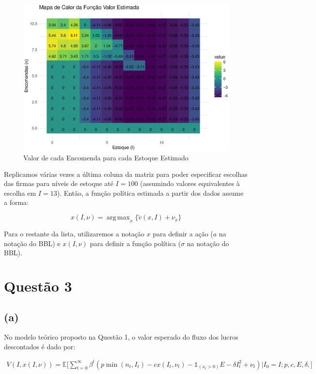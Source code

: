 \documentclass{article}
\DeclareMathOperator*{\argmax}{arg\,max}
\begin{document}
\begin{figure}[H]
    \centering
    \includegraphics{figs and tabs/value_function.eps}
    \caption{Valor de cada Encomenda para cada Estoque Estimado}
    \label{fig:valuefunction}
\end{figure}

Replicamos várias vezes a última coluna da matriz para poder especificar escolhas das firmas para níveis de estoque até $I = 100$ (assumindo valores equivalentes à escolha em $I=13$). Então, a função política estimada a partir dos dados assume a forma:

\begin{equation*}
    x(I,\nu) = \argmax_x \{ \tilde{v}(x, I) + \nu_x \}
\end{equation*}

Para o restante da lista, utilizaremos a notação $x$ para definir a ação ($a$ na notação do BBL) e $x(I,\nu)$ para definir a função política ($\sigma$ na notação do BBL).

\section*{Questão 3}

\subsection*{(a)}

No modelo teórico proposto na Questão 1, o valor esperado do fluxo dos lucros descontados é dado por:

\begin{equation*}
    \begin{aligned}
    V(I,x(I,\nu))=\mathbb{E}\bigg[\sum_{t=0}^\infty\beta^t \left(p\min(n_t,I_t) - cx(I_t,\nu_t) - \mathds{1}_{(x_t>0)}E - \delta I_t^2 + \nu_t\right)  \bigg|I_0=I; p,c,E,\delta,\bigg]
    \end{aligned}
\end{equation*}
\end{document}
